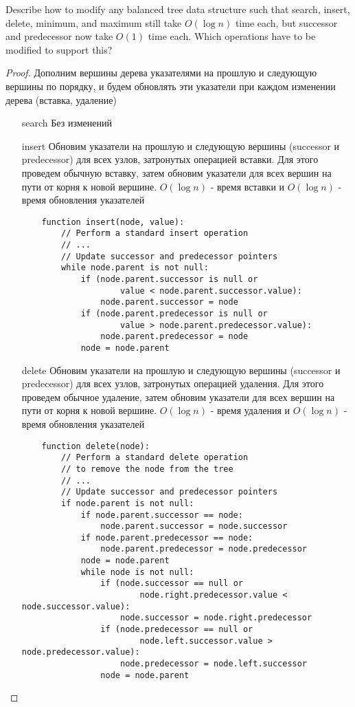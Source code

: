 \begin{prob}
Describe how to modify any balanced tree data structure such that search, insert, delete, minimum, and maximum still take $O(\log n)$ time each, but successor and predecessor now take $O(1)$ time each. Which operations have to be modified to support this?
\end{prob}
\vskip 0.2in
\begin{proof}
Дополним вершины дерева указателями на прошлую и следующую вершины по порядку, и будем обновлять эти указатели при каждом изменении дерева (вставка, удаление)

\begin{itemize}
\item[]
\item[search] Без изменений
\item[insert] Обновим указатели на прошлую и следующую вершины (successor и predecessor) для всех узлов, затронутых операцией вставки. Для этого проведем обычную вставку, затем обновим указатели для всех вершин на пути от корня к новой вершине. $O(\log n)$ - время вставки и $O(\log n)$ - время обновления указателей
    \begin{lstlisting}
    function insert(node, value):
        // Perform a standard insert operation
        // ...
        // Update successor and predecessor pointers
        while node.parent is not null:
            if (node.parent.successor is null or
                    value < node.parent.successor.value):
                node.parent.successor = node
            if (node.parent.predecessor is null or
                    value > node.parent.predecessor.value):
                node.parent.predecessor = node
            node = node.parent
    \end{lstlisting}
\item[delete] Обновим указатели на прошлую и следующую вершины (successor и predecessor) для всех узлов, затронутых операцией удаления. Для этого проведем обычное удаление, затем обновим указатели для всех вершин на пути от корня к новой вершине. $O(\log n)$ - время удаления и $O(\log n)$ - время обновления указателей
    \begin{lstlisting}
    function delete(node):
        // Perform a standard delete operation
        // to remove the node from the tree
        // ...
        // Update successor and predecessor pointers
        if node.parent is not null:
            if node.parent.successor == node:
                node.parent.successor = node.successor
            if node.parent.predecessor == node:
                node.parent.predecessor = node.predecessor
            node = node.parent
            while node is not null:
                if (node.successor == null or
                        node.right.predecessor.value < node.successor.value):
                    node.successor = node.right.predecessor
                if (node.predecessor == null or
                        node.left.successor.value > node.predecessor.value):
                    node.predecessor = node.left.successor
                node = node.parent
    \end{lstlisting}


\end{itemize}
\end{proof}

